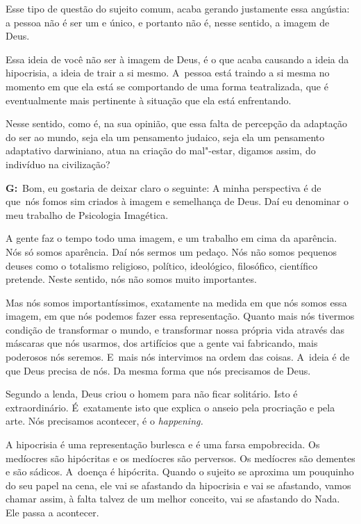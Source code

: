  

Esse tipo de questão do sujeito comum, acaba gerando justamente essa
angústia: a pessoa não é ser um e único, e portanto não é, nesse
sentido, a imagem de Deus.

 

Essa ideia de você não ser à imagem de Deus, é o que acaba causando a
ideia da hipocrisia, a ideia de trair a si mesmo. A~pessoa está traindo
a si mesma no momento em que ela está se comportando de uma forma
teatralizada, que é eventualmente mais pertinente à situação que ela
está enfrentando.

 

Nesse sentido, como é, na sua opinião, que essa falta de percepção da
adaptação do ser ao mundo, seja ela um pensamento judaico, seja ela um
pensamento adaptativo darwiniano, atua na criação do mal"-estar, digamos
assim, do indivíduo na civilização?

 

\textbf{G:}~Bom, eu gostaria de deixar claro o seguinte: A minha
perspectiva é de que\textbf{}~nós fomos sim criados à imagem e
semelhança de Deus. Daí eu denominar o meu trabalho de Psicologia
Imagética.

 

A gente faz o tempo todo uma imagem, e um trabalho em cima da aparência.
Nós só somos aparência. Daí nós sermos um pedaço. Nós não somos pequenos
deuses como o totalismo religioso, político, ideológico, filosófico,
científico pretende. Neste sentido, nós não somos muito importantes.

 

Mas nós somos importantíssimos, exatamente na medida em que nós somos
essa imagem, em que nós podemos fazer essa representação. Quanto mais
nós tivermos condição de transformar o mundo, e transformar nossa
própria vida através das máscaras que nós usarmos, dos artifícios que a
gente vai fabricando, mais poderosos nós seremos. E~mais nós intervimos
na ordem das coisas. A~ideia é de que Deus precisa de nós. Da mesma
forma que nós precisamos de Deus.

 

Segundo a lenda, Deus criou o homem para não ficar solitário. Isto é
extraordinário. É~exatamente isto que explica o anseio pela procriação e
pela arte. Nós precisamos acontecer, é o \emph{happening.}

 

A hipocrisia é uma representação burlesca e é uma farsa empobrecida. Os
medíocres são hipócritas e os medíocres são perversos. Os medíocres são
dementes e são sádicos. A~doença é hipócrita. Quando o sujeito se
aproxima um pouquinho do seu papel na cena, ele vai se afastando da
hipocrisia e vai se afastando, vamos chamar assim, à falta talvez de um
melhor conceito, vai se afastando do Nada. Ele passa a acontecer.

